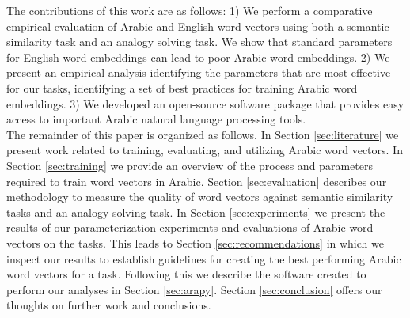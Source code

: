 The contributions of this work are as follows: 1) We perform a comparative empirical evaluation of Arabic and English word vectors using both a semantic similarity task and an analogy solving task. We show that standard parameters for English word embeddings can lead to poor Arabic word embeddings. 2) We present an empirical analysis identifying the parameters that are most effective for our tasks, identifying a set of best practices for training Arabic word embeddings. 3) We developed an open-source software package that provides easy access to important Arabic natural language processing tools. 
\\
The remainder of this paper is organized as follows. In Section \ref{sec:literature} we present work related to training, evaluating, and utilizing Arabic word vectors. In Section \ref{sec:training} we provide an overview of the process and parameters required to train word vectors in Arabic. Section \ref{sec:evaluation} describes our methodology to measure the quality of word vectors against semantic similarity tasks and an analogy solving task. In Section \ref{sec:experiments} we present the results of our parameterization experiments and evaluations of Arabic word vectors on the tasks. This leads to Section \ref{sec:recommendations} in which we inspect our results to establish guidelines for creating the best performing Arabic word vectors for a task. Following this we describe the software created to perform our analyses in Section \ref{sec:arapy}. Section \ref{sec:conclusion} offers our thoughts on further work and conclusions.

